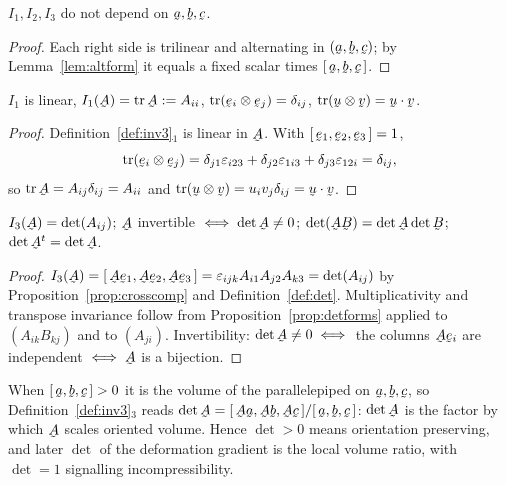 \begin{proposition}\label{prop:invwd}
$I_{1},I_{2},I_{3}$ do not depend on $\ba,\bb,\bc$.
\end{proposition}

\begin{proof}
Each right side is trilinear and alternating in $(\ba,\bb,\bc)$; by
Lemma~\ref{lem:altform} it equals a fixed scalar times $\tbox\ba\bb\bc$.
\end{proof}

\begin{theorem}[Trace]\label{thm:trace}
$I_{1}$ is linear, $I_{1}(\bA)=\tr\bA:=A_{ii}$,
$\tr(\be_{i}\otimes\be_{j})=\dd_{ij}$, $\tr(\bu\otimes\bv)=\ip\bu\bv$.
\end{theorem}

\begin{proof}
Definition~\ref{def:inv3}$_1$ is linear in $\bA$. With $\tbox{\be_1}{\be_2}{\be_3}=1$,
\[
\tr(\be_{i}\otimes\be_{j})
=\dd_{j1}\eps_{i23}+\dd_{j2}\eps_{1i3}+\dd_{j3}\eps_{12i}=\dd_{ij},
\]
so $\tr\bA=A_{ij}\dd_{ij}=A_{ii}$ and $\tr(\bu\otimes\bv)=u_iv_j\dd_{ij}
=\ip\bu\bv$.
\end{proof}

\begin{theorem}[Determinant]\label{thm:det}
$I_{3}(\bA)=\det(A_{ij})$; $\bA$ invertible $\iff\det\bA\neq0$;
$\det(\bA\bB)=\det\bA\det\bB$; $\det\bA^{t}=\det\bA$.
\end{theorem}

\begin{proof}
$I_{3}(\bA)=\tbox{\bA\be_1}{\bA\be_2}{\bA\be_3}=\eps_{ijk}A_{i1}A_{j2}A_{k3}
=\det(A_{ij})$ by Proposition~\ref{prop:crosscomp} and
Definition~\ref{def:det}. Multiplicativity and transpose invariance follow
from Proposition~\ref{prop:detforms} applied to $(A_{ik}B_{kj})$ and to
$(A_{ji})$. Invertibility: $\det\bA\neq0\iff$ the columns $\bA\be_i$ are
independent $\iff\bA$ is a bijection.
\end{proof}

\begin{remark}[determinant $=$ oriented volume ratio]\label{rem:vol}
When $\tbox\ba\bb\bc>0$ it is the volume of the parallelepiped on
$\ba,\bb,\bc$, so Definition~\ref{def:inv3}$_3$ reads
$\det\bA=\tbox{\bA\ba}{\bA\bb}{\bA\bc}/\tbox\ba\bb\bc$: $\det\bA$ is the
factor by which $\bA$ scales oriented volume. Hence $\det>0$ means
orientation preserving, and later $\det$ of the deformation gradient is the
local volume ratio, with $\det=1$ signalling incompressibility.
\end{remark}


